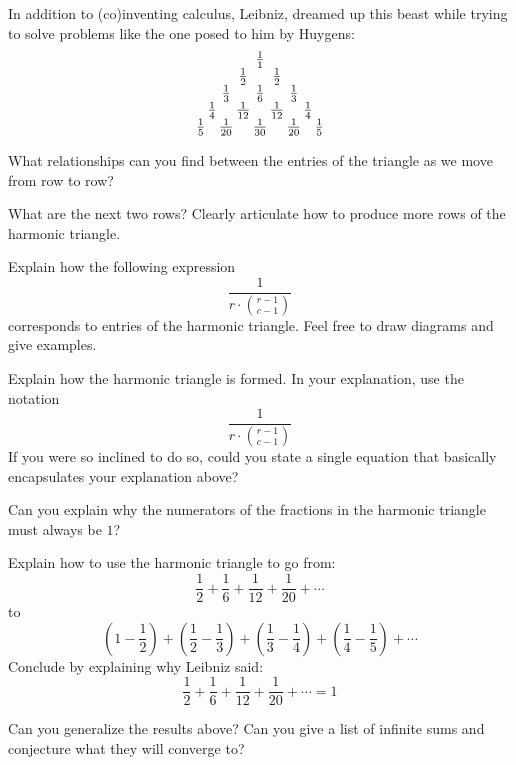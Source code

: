 \documentclass[nooutcomes]{ximera}
\begin{document}
In addition to (co)inventing calculus, Leibniz, dreamed up this beast
while trying to solve problems like the one posed to him by Huygens:
\[
\begin{tabular}{@{\,}c@{\,}c@{\,}c@{\,}c@{\,}c@{\,}c@{\,}c@{\,}c@{\,}c@{\,}}
& & & & $\frac{1}{1}$ & & & & \\
& & & $\frac{1}{2}$ & & $\frac{1}{2}$ & & & \\
& & $\frac{1}{3}$ & & $\frac{1}{6}$ & & $\frac{1}{3}$ & & \\
& $\frac{1}{4}$ & & $\frac{1}{12}$ & & $\frac{1}{12}$ & & $\frac{1}{4}$ &\\
$\frac{1}{5}$ & & $\frac{1}{20}$ & & $\frac{1}{30}$ & & $\frac{1}{20}$ & & $\frac{1}{5}$
\end{tabular}
\]

\begin{question} 
What relationships can you find between the entries of the triangle as
we move from row to row?
\end{question}


\begin{question} 
What are the next two rows? Clearly articulate how to produce more
rows of the harmonic triangle.
\end{question}

\begin{question} Explain how the following expression
\[
\frac{1}{r\cdot\binom{r-1}{c-1}}
\]
corresponds to entries of the harmonic triangle. Feel free to draw
diagrams and give examples.
\end{question}

\begin{question}  
Explain how the harmonic triangle is formed. In your explanation, use
the notation
\[
\frac{1}{r\cdot\binom{r-1}{c-1}}
\]
If you were so inclined to do so, could you state a single equation
that basically encapsulates your explanation above?
\end{question}

\begin{question} 
Can you explain why the numerators of the fractions in the harmonic
triangle must always be $1$?
\end{question}


\begin{question} Explain how to use the harmonic triangle to go from:
\[
\frac{1}{2} + \frac{1}{6} + \frac{1}{12} + \frac{1}{20}+\cdots
\]
to
\[
\left(1 - \frac{1}{2}\right) + \left(\frac{1}{2}-\frac{1}{3}\right) + 
\left(\frac{1}{3}- \frac{1}{4}\right) + \left(\frac{1}{4}-\frac{1}{5}\right) + \cdots 
\]
Conclude by explaining why Leibniz said:
\[
\frac{1}{2} + \frac{1}{6} + \frac{1}{12} + \frac{1}{20}+\cdots = 1
\]
\end{question}

\begin{question} 
Can you generalize the results above? Can you give a list of infinite
sums and conjecture what they will converge to?
\end{question}
\end{document}
